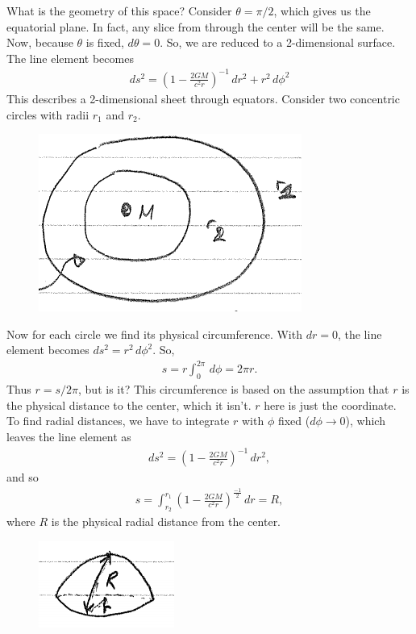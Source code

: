 \documentclass{book}
\theoremstyle{definition}
\newcommand{\f}[2]{\frac{#1}{#2}}
\newcommand{\lp}{\left(}
\newcommand{\rp}{\right)}
\begin{document}
What is the geometry of this space? Consider $\theta = \pi/2$, which gives us the equatorial plane. In fact, any slice from through the center will be the same. Now, because $\theta$ is fixed, $d\theta = 0$. So, we are reduced to a 2-dimensional surface. The line element becomes
\begin{align*}
\boxed{ds^2 = \left( 1 - \frac{2GM}{c^2r}\right)^{-1}\,dr^2 + r^2\,d\phi^2}
\end{align*}
This describes a 2-dimensional sheet through equators. Consider two concentric circles with radii $r_1$ and $r_2$. 
\begin{figure}[!htb]
	\centering
	\includegraphics[scale=0.5]{circs}
\end{figure}
Now for each circle we find its physical circumference. With $dr = 0$, the line element becomes $ds^2 = r^2\,d\phi^2$. So,
\begin{align*}
s = r \int^{2\pi}_{0}\,d\phi = 2\pi r.
\end{align*}
Thus $r = s/2\pi$, but is it? This circumference is based on the assumption that $r$ is the physical distance to the center, which it isn't. $r$ here is just the coordinate. To find radial distances, we have to integrate $r$ with $\phi$ fixed ($d\phi \to 0$), which leaves the line element as
\begin{align*}
ds^2 = \lp 1 - \f{2GM}{c^2r} \rp^{-1}\,dr^2,
\end{align*}
and so
\begin{align*}
s = \int^{r_1}_{r_2}\lp 1-  \f{2GM}{c^2r} \rp^{\f{-1}{2}}\,dr = R,
\end{align*}
where $R$ is the physical radial distance from the center. 
\begin{figure}[!htb]
	\centering
	\includegraphics[scale=0.8]{radial}
\end{figure}
\end{document}
